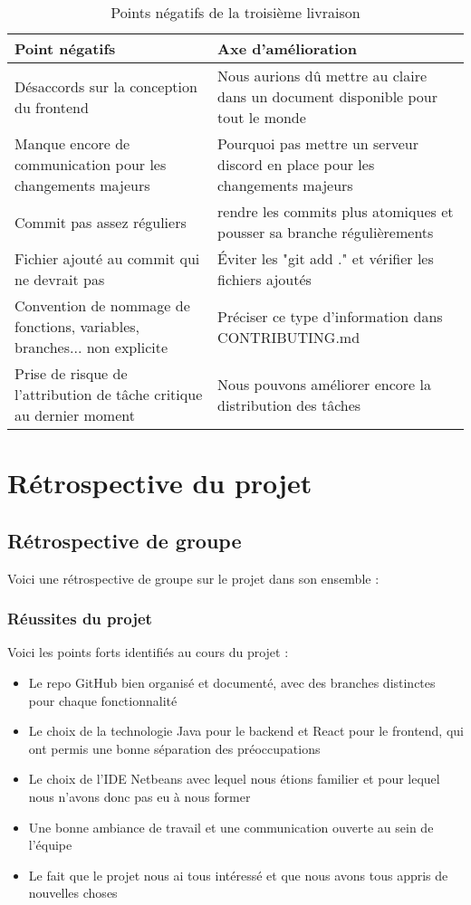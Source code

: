 \documentclass[a4paper]{article}
\begin{document}
    \begin{table}[H]
    \centering
    \begin{tabularx}{\textwidth}{|X|X|}
    \hline
    \textbf{Point négatifs} & \textbf{Axe d'amélioration} \\ \hline
    Désaccords sur la conception du frontend & Nous aurions dû mettre au claire dans un document disponible pour tout le monde \\ \hline
    Manque encore de communication pour les changements majeurs & Pourquoi pas mettre un serveur discord en place pour les changements majeurs\\ \hline
    Commit pas assez réguliers & rendre les commits plus atomiques et pousser sa branche régulièrements \\ \hline
    Fichier ajouté au commit qui ne devrait pas & Éviter les "git add ." et vérifier les fichiers ajoutés \\ \hline
    Convention de nommage de fonctions, variables, branches... non explicite & Préciser ce type d'information dans CONTRIBUTING.md \\ \hline
    Prise de risque de l'attribution de tâche critique au dernier moment & Nous pouvons améliorer encore la distribution des tâches \\ \hline
    \end{tabularx}
    \caption{Points négatifs de la troisième livraison}
    \label{tab:negatifs}
    \end{table}


\newpage
\section{Rétrospective du projet}

\subsection{Rétrospective de groupe}
Voici une rétrospective de groupe sur le projet dans son ensemble :
\subsubsection{Réussites du projet}
Voici les points forts identifiés au cours du projet :

\begin{itemize}
    \item Le repo GitHub bien organisé et documenté, avec des branches distinctes pour chaque fonctionnalité
    \item Le choix de la technologie Java pour le backend et React pour le frontend, qui ont permis une bonne séparation des préoccupations
    \item Le choix de l'IDE Netbeans avec lequel nous étions familier et pour lequel nous n'avons donc pas eu à nous former
    \item Une bonne ambiance de travail et une communication ouverte au sein de l'équipe
    \item Le fait que le projet nous ai tous intéressé et que nous avons tous appris de nouvelles choses
\end{itemize}
\end{document}
